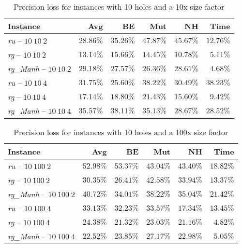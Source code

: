 \begin{table}[H]
  \centering
  \begin{tabular}{|l|r|r|r|r|r|}
    \hline
    \textbf{Instance} & \textbf{Avg} & \textbf{BE} &
    \textbf{Mut} & \textbf{NH} & \textbf{Time} \\
    \hline
    \hline
    \textit{ru} -- $10\ 10\ 2$ &
    $28.86\%$ & $35.26\%$ & $47.87\%$ & $45.67\%$ & $12.76\%$ \\
    \hline
    \textit{rg} -- $10\ 10\ 2$ &
    $13.14\%$ & $15.66\%$ & $14.45\%$ & $10.78\%$ & $5.11\%$ \\
    \hline
    \textit{rg\_Manh} -- $10\ 10\ 2$ &
    $29.18\%$ & $27.57\%$ & $26.36\%$ & $28.61\%$ & $4.68\%$ \\
    \hline
    \textit{ru} -- $10\ 10\ 4$ &
    $31.75\%$ & $25.60\%$ & $38.22\%$ & $30.49\%$ & $38.23\%$ \\
    \hline
    \textit{rg} -- $10\ 10\ 4$ &
    $17.14\%$ & $18.80\%$ & $21.43\%$ & $15.60\%$ & $9.42\%$ \\
    \hline
    \textit{rg\_Manh} -- $10\ 10\ 4$ &
    $35.57\%$ & $38.11\%$ & $35.13\%$ & $28.67\%$ & $28.52\%$ \\
    \hline
  \end{tabular}
  \caption{Precision loss for instances with 10 holes and a 10x size factor}
  \label{tab:precision-10-10}
\end{table}

\begin{table}[H]
  \centering
  \begin{tabular}{|l|r|r|r|r|r|}
    \hline
    \textbf{Instance} & \textbf{Avg} & \textbf{BE} &
    \textbf{Mut} & \textbf{NH} & \textbf{Time} \\
    \hline
    \hline
    \textit{ru} -- $10\ 100\ 2$ &
    $52.98\%$ & $53.37\%$ & $43.04\%$ & $43.40\%$ & $18.82\%$ \\
    \hline
    \textit{rg} -- $10\ 100\ 2$ &
    $30.35\%$ & $26.41\%$ & $42.58\%$ & $33.94\%$ & $13.37\%$ \\
    \hline
    \textit{rg\_Manh} -- $10\ 100\ 2$ &
    $40.72\%$ & $34.01\%$ & $38.22\%$ & $35.04\%$ & $21.42\%$ \\
    \hline
    \textit{ru} -- $10\ 100\ 4$ &
    $33.13\%$ & $32.23\%$ & $33.57\%$ & $17.34\%$ & $13.45\%$ \\
    \hline
    \textit{rg} -- $10\ 100\ 4$ &
    $24.38\%$ & $21.32\%$ & $23.03\%$ & $21.16\%$ & $4.82\%$ \\
    \hline
    \textit{rg\_Manh} -- $10\ 100\ 4$ &
    $22.52\%$ & $23.85\%$ & $27.17\%$ & $22.98\%$ & $5.05\%$ \\
    \hline
  \end{tabular}
  \caption{Precision loss for instances with 10 holes and a 100x size factor}
  \label{tab:precision-10-100}
\end{table}

